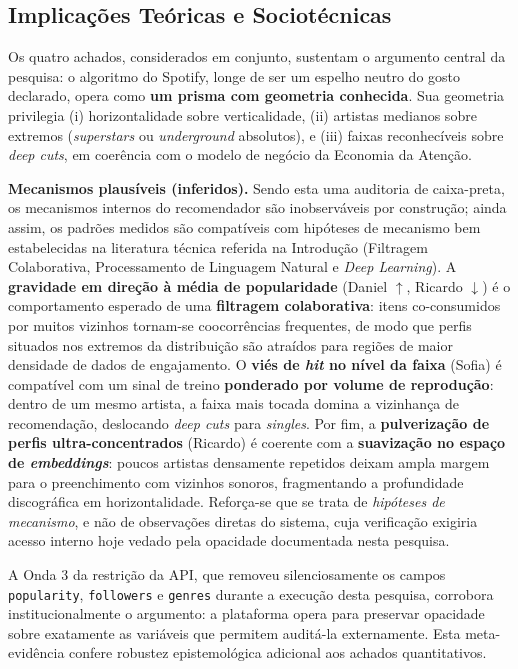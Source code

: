 \documentclass[12pt, %
openright,
oneside, %
a4paper,    %
english,   %
brazil]{facom-ufu-abntex2}
\begin{document}
\subsection{Implicações Teóricas e Sociotécnicas}

Os quatro achados, considerados em conjunto, sustentam o argumento central da
pesquisa: o algoritmo do Spotify, longe de ser um espelho neutro do gosto
declarado, opera como \textbf{um prisma com geometria conhecida}. Sua geometria
privilegia (i) horizontalidade sobre verticalidade, (ii) artistas medianos sobre
extremos (\emph{superstars} ou \emph{underground} absolutos), e (iii) faixas
reconhecíveis sobre \emph{deep cuts}, em coerência com o modelo de negócio da
Economia da Atenção.

\textbf{Mecanismos plausíveis (inferidos).} Sendo esta uma auditoria de
caixa-preta, os mecanismos internos do recomendador são inobserváveis por
construção; ainda assim, os padrões medidos são compatíveis com hipóteses de
mecanismo bem estabelecidas na literatura técnica referida na Introdução
(Filtragem Colaborativa, Processamento de Linguagem Natural e \emph{Deep
Learning}). A \textbf{gravidade em direção à média de popularidade} (Daniel
$\uparrow$, Ricardo $\downarrow$) é o comportamento esperado de uma
\textbf{filtragem colaborativa}: itens co-consumidos por muitos vizinhos
tornam-se coocorrências frequentes, de modo que perfis situados nos extremos da
distribuição são atraídos para regiões de maior densidade de dados de
engajamento. O \textbf{viés de \emph{hit} no nível da faixa} (Sofia) é compatível
com um sinal de treino \textbf{ponderado por volume de reprodução}: dentro de um
mesmo artista, a faixa mais tocada domina a vizinhança de recomendação,
deslocando \emph{deep cuts} para \emph{singles}. Por fim, a \textbf{pulverização
de perfis ultra-concentrados} (Ricardo) é coerente com a \textbf{suavização no
espaço de \emph{embeddings}}: poucos artistas densamente repetidos deixam ampla
margem para o preenchimento com vizinhos sonoros, fragmentando a profundidade
discográfica em horizontalidade. Reforça-se que se trata de \emph{hipóteses de
mecanismo}, e não de observações diretas do sistema, cuja verificação exigiria
acesso interno hoje vedado pela opacidade documentada nesta pesquisa.

A Onda 3 da restrição da API, que removeu silenciosamente os campos
\texttt{popularity}, \texttt{followers} e \texttt{genres} durante a execução desta
pesquisa, corrobora institucionalmente o argumento: a plataforma opera para
preservar opacidade sobre exatamente as variáveis que permitem auditá-la
externamente. Esta meta-evidência confere robustez epistemológica adicional aos
achados quantitativos.
\end{document}

